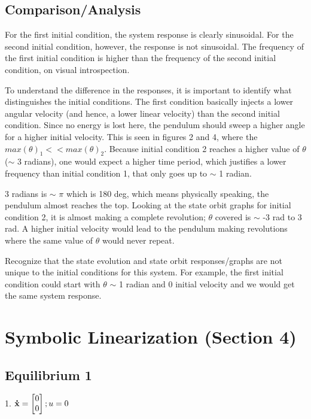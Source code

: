 \documentclass[10pt]{article}
\begin{document}
\subsection{Comparison/Analysis}
    For the first initial condition, the system response is clearly sinusoidal. For the second initial condition, however, the response is not sinusoidal. The frequency of the first initial condition is higher than the frequency of the second initial condition, on visual introspection. 
    
    To understand the difference in the responses, it is important to identify what distinguishes the initial conditions. The first condition basically injects a lower angular velocity (and hence, a lower linear velocity) than the second initial condition. Since no energy is lost here, the pendulum should sweep a higher angle for a higher initial velocity. This is seen in figures 2 and 4, where the \begin{math}
     max(\theta)_1 << max(\theta)_2
    \end{math}. Because initial condition 2 reaches a higher value of $\theta$ ($\sim$ 3 radians), one would expect a higher time period, which justifies a lower frequency than initial condition 1, that only goes up to $\sim$ 1 radian. 
    
    3 radians is $\sim$ $\pi$ which is 180 deg, which means physically speaking, the pendulum almost reaches the top. Looking at the state orbit graphs for initial condition 2, it is almost making a complete revolution; $\theta$ covered is $\sim$ -3 rad to 3 rad. A higher initial velocity would lead to the pendulum making revolutions where the same value of $\theta$ would never repeat. 
    
    Recognize that the state evolution and state orbit responses/graphs are not unique to the initial conditions for this system. For example, the first initial condition could start with $\theta$ $\sim$ 1 radian and 0 initial velocity and we would get the same system response. 
    

\section{Symbolic Linearization (Section 4)}

\subsection{Equilibrium 1}
\begin{center}
    1.
    \begin{math}
     \mathbf{\dot{x}} = \begin{bmatrix} 0\\0 \end{bmatrix}
     ;
     u = 0
    \end{math}
\end{center}
\end{document}
